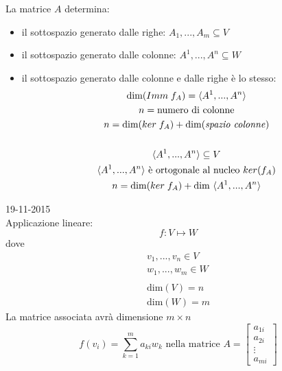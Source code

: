 \documentclass[italian]{article}
\newcommand{\tright}[1]{\hfill #1 \\}
\renewcommand{\dim}[1]{\text{dim$\left(#1\right)$}}
\begin{document}
La matrice $A$ determina:
\begin{itemize}
	\item il sottospazio generato dalle righe: $A_1,...,A_m \subseteq V$
	\item il sottospazio generato dalle colonne: $A^1,...,A^n \subseteq W$
	\item il sottospazio generato dalle colonne e dalle righe è lo stesso:
		\begin{gather*}
			\text{dim}(Imm \; f_A) = \langle A^1, ... , A^n \rangle \\
			n = \text{numero di colonne} \\
			n = \text{dim}(ker \; f_A) + \text{dim(\textit{spazio colonne})} \\\\
			\langle A^1, ... , A^n \rangle \subseteq V \\
			\langle A^1, ... , A^n \rangle \text{ è ortogonale al nucleo }ker(f_A) \\
			n = \text{dim}(ker \; f_A) + \text{dim } \langle A^1, ... , A^n \rangle 
		\end{gather*}
\end{itemize}

\newpage
\tright{19-11-2015}
Applicazione lineare:
\[
	f: V \longmapsto W
\]
dove 
\begin{gather*}
	v_1,...,v_n \in V \\
	w_1,...,w_m \in W \\\\
	\dim{V} = n \\
	\dim{W} = m
\end{gather*}
La matrice associata avrà dimensione $m \times n$
\[
	f(v_i) = \sum_{k=1}^{m}a_{ki}w_k \text{ nella matrice } A = 
	\begin{bmatrix}
		a_{1i} \\ a_{2i} \\ \vdots \\ a_{mi}
	\end{bmatrix}
\]
\end{document}
